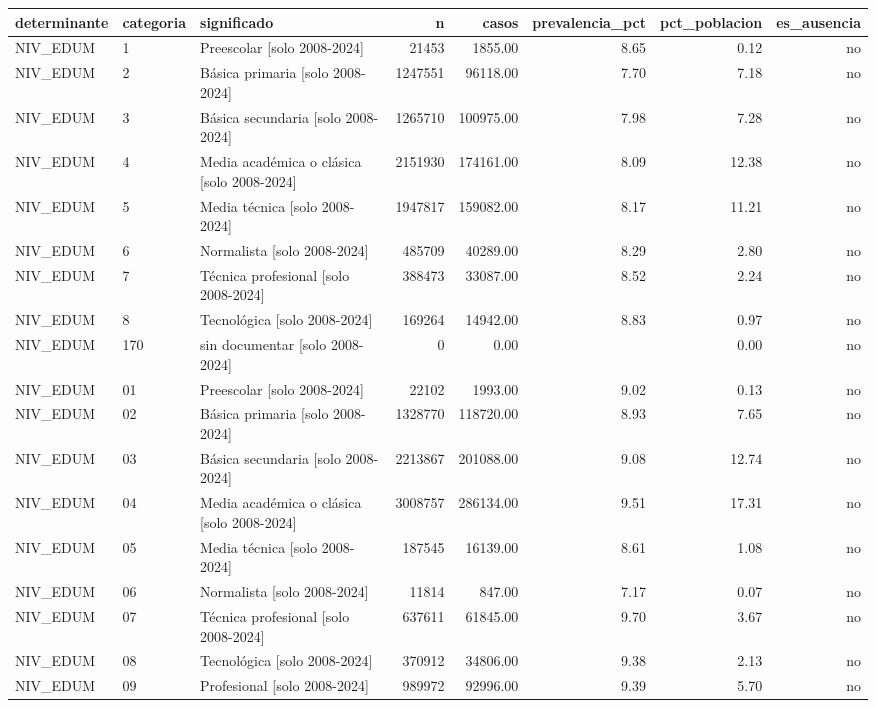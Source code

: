 \begin{tabular}{lllrrrrr}
\toprule
determinante & categoria & significado & n & casos & prevalencia\_pct & pct\_poblacion & es\_ausencia \\
\midrule
NIV\_EDUM & 1 & Preescolar  [solo 2008-2024] & 21453 & 1855.00 & 8.65 & 0.12 & no \\
NIV\_EDUM & 2 & Básica primaria  [solo 2008-2024] & 1247551 & 96118.00 & 7.70 & 7.18 & no \\
NIV\_EDUM & 3 & Básica secundaria  [solo 2008-2024] & 1265710 & 100975.00 & 7.98 & 7.28 & no \\
NIV\_EDUM & 4 & Media académica o clásica  [solo 2008-2024] & 2151930 & 174161.00 & 8.09 & 12.38 & no \\
NIV\_EDUM & 5 & Media técnica  [solo 2008-2024] & 1947817 & 159082.00 & 8.17 & 11.21 & no \\
NIV\_EDUM & 6 & Normalista  [solo 2008-2024] & 485709 & 40289.00 & 8.29 & 2.80 & no \\
NIV\_EDUM & 7 & Técnica profesional  [solo 2008-2024] & 388473 & 33087.00 & 8.52 & 2.24 & no \\
NIV\_EDUM & 8 & Tecnológica  [solo 2008-2024] & 169264 & 14942.00 & 8.83 & 0.97 & no \\
NIV\_EDUM & 170 & sin documentar  [solo 2008-2024] & 0 & 0.00 &  & 0.00 & no \\
NIV\_EDUM & 01 & Preescolar  [solo 2008-2024] & 22102 & 1993.00 & 9.02 & 0.13 & no \\
NIV\_EDUM & 02 & Básica primaria  [solo 2008-2024] & 1328770 & 118720.00 & 8.93 & 7.65 & no \\
NIV\_EDUM & 03 & Básica secundaria  [solo 2008-2024] & 2213867 & 201088.00 & 9.08 & 12.74 & no \\
NIV\_EDUM & 04 & Media académica o clásica  [solo 2008-2024] & 3008757 & 286134.00 & 9.51 & 17.31 & no \\
NIV\_EDUM & 05 & Media técnica  [solo 2008-2024] & 187545 & 16139.00 & 8.61 & 1.08 & no \\
NIV\_EDUM & 06 & Normalista  [solo 2008-2024] & 11814 & 847.00 & 7.17 & 0.07 & no \\
NIV\_EDUM & 07 & Técnica profesional  [solo 2008-2024] & 637611 & 61845.00 & 9.70 & 3.67 & no \\
NIV\_EDUM & 08 & Tecnológica  [solo 2008-2024] & 370912 & 34806.00 & 9.38 & 2.13 & no \\
NIV\_EDUM & 09 & Profesional  [solo 2008-2024] & 989972 & 92996.00 & 9.39 & 5.70 & no \\

\end{tabular}
